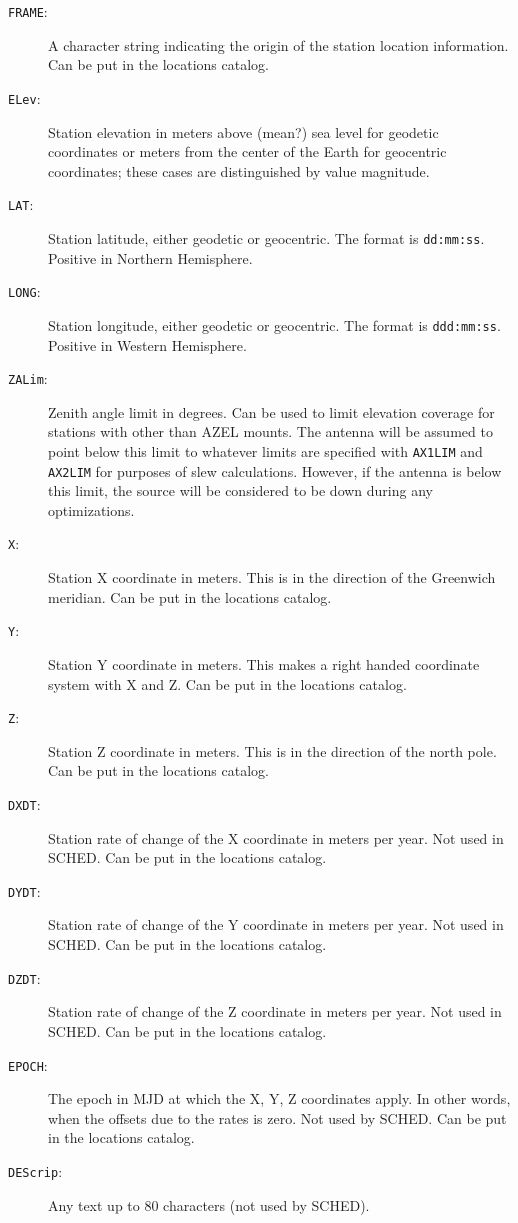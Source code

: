 \documentclass{report}
\newcommand{\sched}{{\sc SCHED}}
\begin{document}
\begin{description}

\item [{\tt FRAME}:] A character string indicating the origin
of the station location information.  Can be put in the locations
catalog.

\item [{\tt ELev}:] Station elevation in meters above (mean?) sea
level for geodetic coordinates or meters from the center of the Earth
for geocentric coordinates; these cases are distinguished by value
magnitude.

\item [{\tt LAT}:] Station latitude, either geodetic or geocentric.
The format is {\tt dd:mm:ss}. Positive in Northern Hemisphere.

\item [{\tt LONG}:] Station longitude, either geodetic or geocentric.
The format is {\tt ddd:mm:ss}. Positive in Western Hemisphere.

\item [{\tt ZALim}:] Zenith angle limit in degrees.  Can be used to
limit elevation coverage for stations with other than AZEL mounts.
The antenna will be assumed to point below this limit to whatever
limits are specified with {\tt AX1LIM} and {\tt AX2LIM} for purposes
of slew calculations.  However, if the antenna is below this limit,
the source will be considered to be down during any optimizations.

\item [{\tt X}:] Station X coordinate in meters.  This is in the
direction of the Greenwich meridian.  Can be put in the locations
catalog.

\item [{\tt Y}:] Station Y coordinate in meters.  This makes a right
handed coordinate system with X and Z.  Can be put in the locations
catalog.

\item [{\tt Z}:] Station Z coordinate in meters.  This is in the
direction of the north pole.  Can be put in the locations catalog.

\item [{\tt DXDT}:] Station rate of change of the X coordinate in
meters per year.  Not used in \sched.  Can be put in the locations
catalog.

\item [{\tt DYDT}:] Station rate of change of the Y coordinate
in meters per year.  Not used in \sched.  Can be put in the locations
catalog.

\item [{\tt DZDT}:] Station rate of change of the Z coordinate
in meters per year.  Not used in \sched.  Can be put in the locations
catalog.

\item [{\tt EPOCH}:] The epoch in MJD at which the X, Y, Z
coordinates apply.  In other words, when the offsets due to the
rates is zero.  Not used by \sched.  Can be put in the locations
catalog.

\item [{\tt DEScrip}:] Any text up to 80 characters (not used
by \sched).

\end{description}
\end{document}

